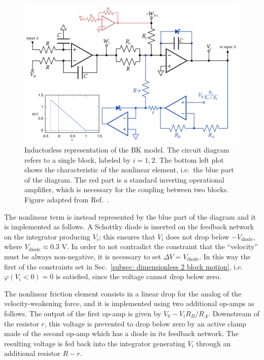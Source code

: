 \begin{figure}[!htbp]
    \centering
    \includegraphics[width=\linewidth]
    {../blocks/1_block/breadboard/breadboard_implementation.png}
    \caption{Inductorless representation of the BK model. The circuit diagram refers to a single block, labeled by $i=1,2$.
    The bottom left plot shows the characteristic of the nonlinear element, i.e.\ the blue part of the diagram.
    The red part is a standard inverting operational amplifier, which is necessary for the coupling between two blocks.
    Figure adapted from Ref.~\cite{ref:electronic_analog}.
    }\label{fig: circuit diagram}
\end{figure}

The nonlinear term is instead represented by the blue part of the diagram and it is implemented as follows.
A Schottky diode is inserted on the feedback network on the integrator producing $V_i$; this ensures that $V_i$ does not
drop below $-V_{\text{diode}}$, where $V_{\text{diode}}\approx 0.3$ V. In order to not contradict the constraint
that the ``velocity'' must be always non-negative, it is necessary to set $\Delta V = V_{\text{diode}}$.
In this way the first of the constraints set in Sec.~\ref{subsec: dimensionless 2 block motion}, i.e.\ $\varphi(V_i < 0 )=0$
is satisfied, since the voltage cannot drop below zero.

The nonlinear friction element consists in a linear drop for the analog of the velocity-weakening force, and it is
implemented using two additional op-amps as follows. The output of the first op-amp is given by $V_0-V_i R_B/R_A$.
Downstream of the resistor $r$, this voltage is prevented to drop below zero by an active
clamp made of the second op-amp which has a diode in its feedback network. The resulting voltage is fed back into
the integrator generating $V_i$ through an additional resistor $R-r$.


